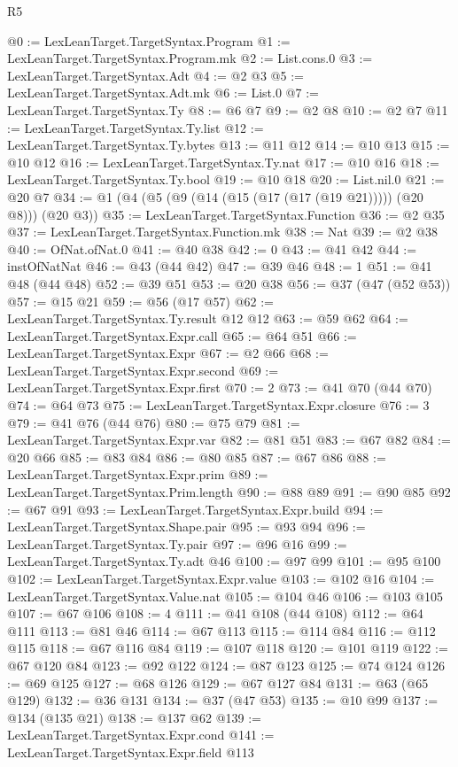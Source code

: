 \begin{lexlean}{R5}
\begin{coremodule}
@0 := LexLeanTarget.TargetSyntax.Program
@1 := LexLeanTarget.TargetSyntax.Program.mk
@2 := List.cons.{0}
@3 := LexLeanTarget.TargetSyntax.Adt
@4 := @2 @3
@5 := LexLeanTarget.TargetSyntax.Adt.mk
@6 := List.{0}
@7 := LexLeanTarget.TargetSyntax.Ty
@8 := @6 @7
@9 := @2 @8
@10 := @2 @7
@11 := LexLeanTarget.TargetSyntax.Ty.list
@12 := LexLeanTarget.TargetSyntax.Ty.bytes
@13 := @11 @12
@14 := @10 @13
@15 := @10 @12
@16 := LexLeanTarget.TargetSyntax.Ty.nat
@17 := @10 @16
@18 := LexLeanTarget.TargetSyntax.Ty.bool
@19 := @10 @18
@20 := List.nil.{0}
@21 := @20 @7
@34 := @1 (@4 (@5 (@9 (@14 (@15 (@17 (@17 (@19 @21))))) (@20 @8))) (@20 @3))
@35 := LexLeanTarget.TargetSyntax.Function
@36 := @2 @35
@37 := LexLeanTarget.TargetSyntax.Function.mk
@38 := Nat
@39 := @2 @38
@40 := OfNat.ofNat.{0}
@41 := @40 @38
@42 := 0
@43 := @41 @42
@44 := instOfNatNat
@46 := @43 (@44 @42)
@47 := @39 @46
@48 := 1
@51 := @41 @48 (@44 @48)
@52 := @39 @51
@53 := @20 @38
@56 := @37 (@47 (@52 @53))
@57 := @15 @21
@59 := @56 (@17 @57)
@62 := LexLeanTarget.TargetSyntax.Ty.result @12 @12
@63 := @59 @62
@64 := LexLeanTarget.TargetSyntax.Expr.call
@65 := @64 @51
@66 := LexLeanTarget.TargetSyntax.Expr
@67 := @2 @66
@68 := LexLeanTarget.TargetSyntax.Expr.second
@69 := LexLeanTarget.TargetSyntax.Expr.first
@70 := 2
@73 := @41 @70 (@44 @70)
@74 := @64 @73
@75 := LexLeanTarget.TargetSyntax.Expr.closure
@76 := 3
@79 := @41 @76 (@44 @76)
@80 := @75 @79
@81 := LexLeanTarget.TargetSyntax.Expr.var
@82 := @81 @51
@83 := @67 @82
@84 := @20 @66
@85 := @83 @84
@86 := @80 @85
@87 := @67 @86
@88 := LexLeanTarget.TargetSyntax.Expr.prim
@89 := LexLeanTarget.TargetSyntax.Prim.length
@90 := @88 @89
@91 := @90 @85
@92 := @67 @91
@93 := LexLeanTarget.TargetSyntax.Expr.build
@94 := LexLeanTarget.TargetSyntax.Shape.pair
@95 := @93 @94
@96 := LexLeanTarget.TargetSyntax.Ty.pair
@97 := @96 @16
@99 := LexLeanTarget.TargetSyntax.Ty.adt @46
@100 := @97 @99
@101 := @95 @100
@102 := LexLeanTarget.TargetSyntax.Expr.value
@103 := @102 @16
@104 := LexLeanTarget.TargetSyntax.Value.nat
@105 := @104 @46
@106 := @103 @105
@107 := @67 @106
@108 := 4
@111 := @41 @108 (@44 @108)
@112 := @64 @111
@113 := @81 @46
@114 := @67 @113
@115 := @114 @84
@116 := @112 @115
@118 := @67 @116 @84
@119 := @107 @118
@120 := @101 @119
@122 := @67 @120 @84
@123 := @92 @122
@124 := @87 @123
@125 := @74 @124
@126 := @69 @125
@127 := @68 @126
@129 := @67 @127 @84
@131 := @63 (@65 @129)
@132 := @36 @131
@134 := @37 (@47 @53)
@135 := @10 @99
@137 := @134 (@135 @21)
@138 := @137 @62
@139 := LexLeanTarget.TargetSyntax.Expr.cond
@141 := LexLeanTarget.TargetSyntax.Expr.field @113

\end{coremodule}
\end{lexlean}
